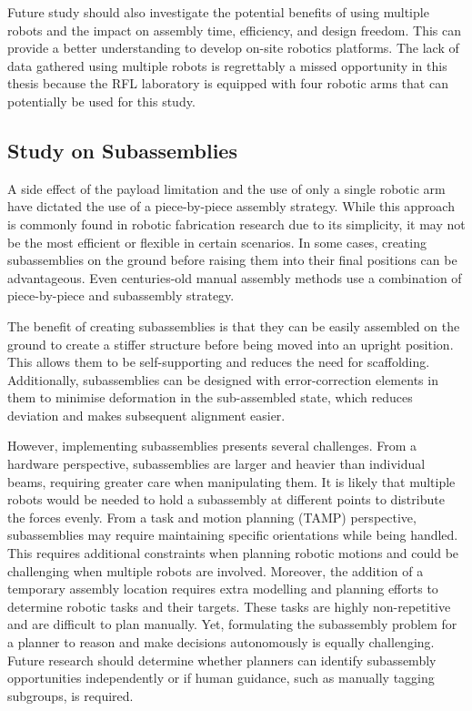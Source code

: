 Future study should also investigate the potential benefits of using multiple robots and the impact on assembly time, efficiency, and design freedom. This can provide a better understanding to develop on-site robotics platforms. The lack of data gathered using multiple robots is regrettably a missed opportunity in this thesis because the RFL laboratory is equipped with four robotic arms that can potentially be used for this study. 

\subsection{Study on Subassemblies}

A side effect of the payload limitation and the use of only a single robotic arm have dictated the use of a piece-by-piece assembly strategy. While this approach is commonly found in robotic fabrication research due to its simplicity, it may not be the most efficient or flexible in certain scenarios. In some cases, creating subassemblies on the ground before raising them into their final positions can be advantageous. Even centuries-old manual assembly methods use a combination of piece-by-piece and subassembly strategy.

The benefit of creating subassemblies is that they can be easily assembled on the ground to create a stiffer structure before being moved into an upright position. This allows them to be self-supporting and reduces the need for scaffolding. Additionally, subassemblies can be designed with error-correction elements in them to minimise deformation in the sub-assembled state, which reduces deviation and makes subsequent alignment easier.

However, implementing subassemblies presents several challenges. From a hardware perspective, subassemblies are larger and heavier than individual beams, requiring greater care when manipulating them. It is likely that multiple robots would be needed to hold a subassembly at different points to distribute the forces evenly. From a task and motion planning (TAMP) perspective, subassemblies may require maintaining specific orientations while being handled. This requires additional constraints when planning robotic motions and could be challenging when multiple robots are involved. Moreover, the addition of a temporary assembly location requires extra modelling and planning efforts to determine robotic tasks and their targets. These tasks are highly non-repetitive and are difficult to plan manually. Yet, formulating the subassembly problem for a planner to reason and make decisions autonomously is equally challenging. Future research should determine whether planners can identify subassembly opportunities independently or if human guidance, such as manually tagging subgroups, is required.


